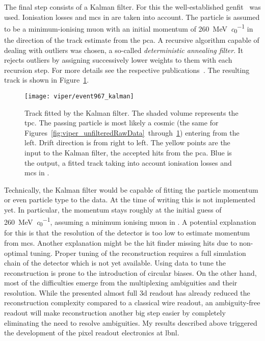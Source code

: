 The final step consists of a Kalman filter.
For this the well-established \gls{genfit}~\cite{genfit1, genfit2} was used.
Ionisation losses and \gls{mcs} in \lar{} are taken into account.
The particle is assumed to be a minimum-ionising muon with an initial momentum of \SI{260}{\mega\electronvolt\per\clight} in the direction of the track estimate from the \gls{pca}.
A recursive algorithm capable of dealing with outliers was chosen, a so-called \emph{deterministic annealing filter}.
It rejects outliers by assigning successively lower weights to them with each recursion step.
For more details see the respective publications~\cite{genfit1, genfit2}.
The resulting track is shown in Figure~\ref{fig:viper_kalman}.

\begin{figure}[htb]
	\centering
	\texttt{[image: viper/event967\_kalman]}
	\caption[Kalman-fitted track of typical pixel demonstrator event]{%
		Track fitted by the Kalman filter.
		The shaded volume represents the \acrshort{tpc}.
		The passing particle is most likely a cosmic \Pgm (the same for Figures~\ref{fig:viper_unfilteredRawData}~through~\ref{fig:viper_kalman}) entering from the left.
		Drift direction is from right to left.
		The yellow points are the input to the Kalman filter, the accepted hits from the \acrshort{pca}.
		Blue is the output, a fitted track taking into account ionisation losses and \acrshort{mcs} in \lar{}.
	}
	\label{fig:viper_kalman}
\end{figure}

Technically, the Kalman filter would be capable of fitting the particle momentum or even particle type to the data.
At the time of writing this is not implemented yet.
In particular, the momentum stays roughly at the initial guess of \SI{260}{\mega\electronvolt\per\clight}, assuming a minimum ionising muon in \lar{}.
A potential explanation for this is that the resolution of the detector is too low to estimate momentum from \gls{mcs}.
Another explanation might be the hit finder missing hits due to non-optimal tuning.
Proper tuning of the reconstruction requires a full simulation chain of the detector which is not yet available.
Using data to tune the reconstruction is prone to the introduction of circular biases.
On the other hand, most of the difficulties emerge from the multiplexing ambiguities and their resolution.
While the presented almost full \gls{3d} readout has already reduced the reconstruction complexity compared to a classical wire readout, an ambiguity-free readout will make reconstruction another big step easier by completely eliminating the need to resolve ambiguities.
My results described above triggered the development of the \larpix{} pixel readout electronics at \gls{lbnl}.


